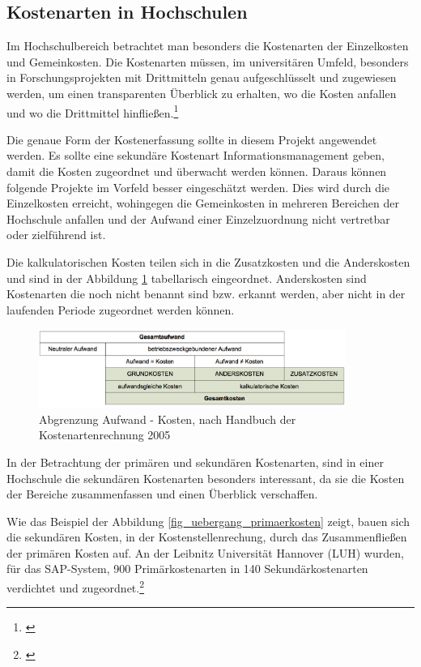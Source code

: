 \subsection{Kostenarten in Hochschulen}
Im Hochschulbereich betrachtet man besonders die Kostenarten der Einzelkosten und Gemeinkosten. Die Kostenarten müssen, im universitären Umfeld, besonders in Forschungsprojekten mit Drittmitteln genau aufgeschlüsselt und zugewiesen werden, um einen transparenten Überblick zu erhalten, wo die Kosten anfallen und wo die Drittmittel hinfließen.\footnote{\cite{pkl_2005}}

Die genaue Form der Kostenerfassung sollte in diesem Projekt angewendet werden. Es sollte eine sekundäre Kostenart Informationsmanagement geben, damit die Kosten zugeordnet und überwacht werden können. Daraus können folgende Projekte im Vorfeld besser eingeschätzt werden. Dies wird durch die Einzelkosten erreicht, wohingegen die Gemeinkosten in mehreren Bereichen der Hochschule anfallen und der Aufwand einer Einzelzuordnung nicht vertretbar oder zielführend ist.

Die kalkulatorischen Kosten teilen sich in die Zusatzkosten und die Anderskosten und sind in der Abbildung \ref{fig_abgrenzung_aufwand} tabellarisch eingeordnet. Anderskosten sind Kostenarten die noch nicht benannt sind bzw. erkannt werden, aber nicht in der laufenden Periode zugeordnet werden können. 

\begin{figure}[h!]
	\centering
	\includegraphics[width=10cm]{kapitel/gruppe4_2/bilder/abgrenzung_aufwand}
	\caption{Abgrenzung Aufwand - Kosten, nach Handbuch der Kostenartenrechnung 2005}
	\label{fig_abgrenzung_aufwand}
\end{figure}

In der Betrachtung der primären und sekundären Kostenarten, sind in einer Hochschule die sekundären Kostenarten besonders interessant, da sie die Kosten der Bereiche zusammenfassen und einen Überblick verschaffen.

Wie das Beispiel der Abbildung \ref{fig_uebergang_primaerkosten} zeigt, bauen sich die sekundären Kosten, in der Kostenstellenrechung, durch das Zusammenfließen der primären Kosten auf. An der Leibnitz Universität Hannover (LUH) wurden, für das SAP-System, 900 Primärkostenarten in 140 Sekundärkostenarten verdichtet und zugeordnet.\footnote{\cite{pkl_2005}}

